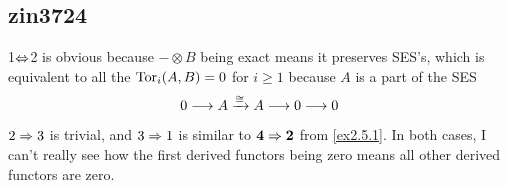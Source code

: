\subsection{zin3724}
1$\Leftrightarrow$2 is obvious because $-\otimes B$ being exact means it preserves SES's, which is equivalent to all the $\operatorname{\operatorname{Tor}}_i(A,B)=0$ for $i\ge1$ because $A$ is a part of the SES
\[0\longrightarrow A\xrightarrow{\cong}A\longrightarrow0\longrightarrow0\]

$2\Rightarrow3$ is trivial, and $3\Rightarrow1$ is similar to $\mathbf{4\Rightarrow2}$ from \ref{ex2.5.1}. In both cases, I can't really see how the first derived functors being zero means all other derived functors are zero.